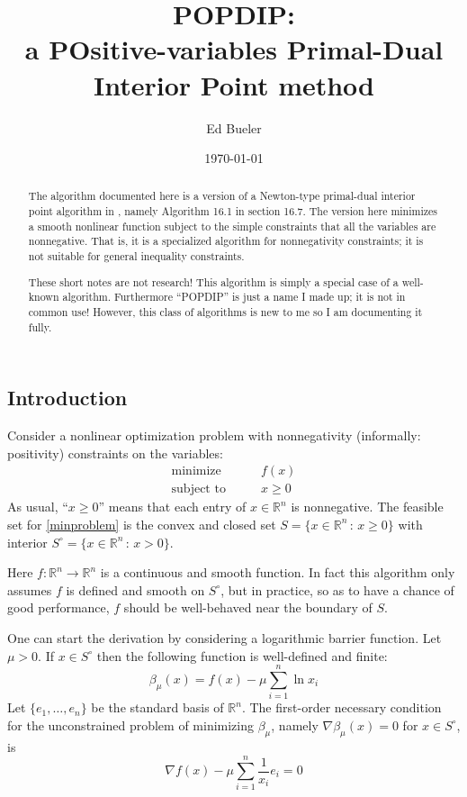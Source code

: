 \documentclass[11pt]{article}
\title{POPDIP: \\ a POsitive-variables Primal-Dual Interior Point method}
\author{Ed Bueler}
\date{\today}
\newcommand{\RR}{\mathbb{R}}
\newcommand{\grad}{\nabla}
\begin{document}
\maketitle

\begin{abstract}
The algorithm documented here is a version of a Newton-type primal-dual interior point algorithm in \cite{GrivaNashSofer2009}, namely Algorithm 16.1 in section 16.7.  The version here minimizes a smooth nonlinear function subject to the simple constraints that all the variables are nonnegative.  That is, it is a specialized algorithm for nonnegativity constraints; it is not suitable for general inequality constraints.

These short notes are not research!  This algorithm is simply a special case of a well-known algorithm.  Furthermore ``POPDIP'' is just a name I made up; it is not in common use!  However, this class of algorithms is new to me so I am documenting it fully.
\end{abstract}

\thispagestyle{empty}

\bigskip
\subsection*{Introduction}

Consider a nonlinear optimization problem with nonnegativity (informally: positivity) constraints on the variables:
\begin{equation}
\begin{matrix}
\text{minimize} \qquad & f(x) \\
\text{subject to} \qquad & x \ge 0
\end{matrix} \label{minproblem}
\end{equation}
As usual, ``$x\ge 0$'' means that each entry of $x\in\RR^n$ is nonnegative.  The feasible set for \eqref{minproblem} is the convex and closed set $S = \{x\in \RR^n\,:\,x\ge 0\}$ with interior $S^\circ = \{x\in \RR^n\,:\,x > 0\}$.

Here $f:\RR^n \to\RR^n$ is a continuous and smooth function.  In fact this algorithm only assumes $f$ is defined and smooth on $S^\circ$, but in practice, so as to have a chance of good performance, $f$ should be well-behaved near the boundary of $S$.

One can start the derivation by considering a logarithmic barrier function.  Let $\mu>0$.  If $x\in S^\circ$ then the following function is well-defined and finite:
\begin{equation}
\beta_\mu(x) = f(x) - \mu \sum_{i=1}^n \ln x_i \label{barrierfunction}
\end{equation}
Let $\{e_1,\dots,e_n\}$ be the standard basis of $\RR^n$.  The first-order necessary condition for the unconstrained problem of minimizing $\beta_\mu$, namely $\grad \beta_\mu(x)=0$ for $x \in S^\circ$, is
\begin{equation}
\grad f(x) - \mu \sum_{i=1}^n \frac{1}{x_i} e_i = 0 \label{firstorderbarrier}
\end{equation}
\end{document}
